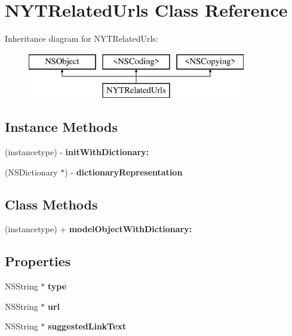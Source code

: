 \section{N\+Y\+T\+Related\+Urls Class Reference}
\label{interface_n_y_t_related_urls}
Inheritance diagram for N\+Y\+T\+Related\+Urls\+:\begin{figure}[H]
\begin{center}
\leavevmode
\includegraphics[height=2.000000cm]{interface_n_y_t_related_urls}
\end{center}
\end{figure}
\subsection*{Instance Methods}
\begin{DoxyCompactItemize}
\item 
(instancetype) -\/ {\bfseries init\+With\+Dictionary\+:}\label{interface_n_y_t_related_urls_a030f0b2b00020aa96408ec7f3e88f7f9}

\item 
(N\+S\+Dictionary $\ast$) -\/ {\bfseries dictionary\+Representation}\label{interface_n_y_t_related_urls_a2e4d2ade66568825d6f11ac0dae60e01}

\end{DoxyCompactItemize}
\subsection*{Class Methods}
\begin{DoxyCompactItemize}
\item 
(instancetype) + {\bfseries model\+Object\+With\+Dictionary\+:}\label{interface_n_y_t_related_urls_a18b5d4ba231361dc59b11005835e3a3a}

\end{DoxyCompactItemize}
\subsection*{Properties}
\begin{DoxyCompactItemize}
\item 
N\+S\+String $\ast$ {\bfseries type}\label{interface_n_y_t_related_urls_ae43798b44c90061e2a42615fb4df1152}

\item 
N\+S\+String $\ast$ {\bfseries url}\label{interface_n_y_t_related_urls_a2ff3ef5bd5c82baf510b45f2f5ba25d4}

\item 
N\+S\+String $\ast$ {\bfseries suggested\+Link\+Text}\label{interface_n_y_t_related_urls_a7bcf7b6df03b943cd07a6c7f119f766c}

\end{DoxyCompactItemize}


